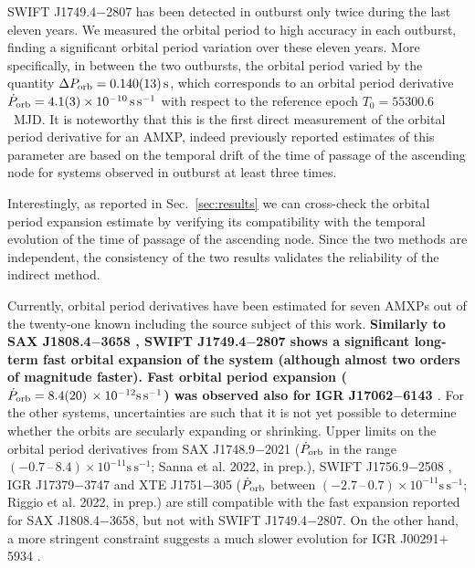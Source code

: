 \documentclass[fleqn,usenatbib]{mnras}
\newcommand{\swiftj}{SWIFT J1749.4$-$2807}
\begin{document}
\swiftj{} has been detected in outburst only twice during the last eleven years. We measured the orbital period to high accuracy in each outburst, finding a significant orbital period variation over these eleven years. More specifically, in between the two outbursts, the orbital period varied by the quantity $\Delta P_{\rm orb}=0.140(13)\,\text{s}$, which corresponds to an orbital period derivative $\dot{P}_{\rm orb}=4.1(3)\times 10^{-10}\,\text{s}\,\text{s}^{-1}$ with respect to the reference epoch $T_0 = 55300.6$~MJD. It is noteworthy that this is the first direct measurement of the orbital period derivative for an AMXP, indeed previously reported estimates of this parameter are based on the temporal drift of the time of passage of the ascending node for systems observed in outburst at least three times.  

Interestingly, as reported in Sec.~\ref{sec:results} we can cross-check the orbital period expansion estimate by verifying its compatibility with the temporal evolution of the time of passage of the ascending node. Since the two methods are independent, the consistency of the two results validates the reliability of the indirect method.  

Currently, orbital period derivatives have been estimated for seven AMXPs out of the twenty-one known including the source subject of this work. \textbf{Similarly to SAX J1808.4$-$3658 \citep[$\dot{P}_{\rm orb}=1.7(5)\,\times 10^{-12}\text{s}\,\text{s}^{-1}$, see e.g.,][]{di-Salvo:2008uu, Patruno:2017ah,Sanna:2017vj,Bult:2020tu}, \swiftj{} shows a significant long-term fast orbital expansion of the system (although almost two orders of magnitude faster). Fast orbital period expansion ($\dot{P}_{\rm orb}=8.4(20)\,\times 10^{-12}\text{s}\,\text{s}^{-1}$) was observed also for IGR J17062$-$6143 \citep{Bult:2021vs}}. For the other systems, uncertainties are such that it is not yet possible to determine whether the orbits are secularly expanding or shrinking. Upper limits on the orbital period derivatives from SAX J1748.9$-$2021 ($\dot{P}_{\rm orb}$ in the range $(-0.7\,\mbox{--}\,8.4)\times 10^{-11}\text{s}\,\text{s}^{-1}$; Sanna et al. 2022, in prep.), SWIFT J1756.9$-$2508 \citep[$\dot{P}_{\rm orb}$ ranging between $(-4.1\,\mbox{--}\,7.1)\times 10^{-12}\text{s}\,\text{s}^{-1}$, see e.g.,][]{Bult:2018ve,Sanna:2018aa}, IGR J17379$-$3747 \citep[$\dot{P}_{\rm orb}$ between $(-9.4\,\mbox{--}\,4.4)\times 10^{-12}\text{s}\,\text{s}^{-1}$;][]{Sanna:2018tx} and XTE J1751$-$305 ($\dot{P}_{\rm orb}$ between $(-2.7\,\mbox{--}\,0.7)\times 10^{-11}\text{s}\,\text{s}^{-1}$; Riggio et al. 2022, in prep.) are still compatible with the fast expansion reported for SAX J1808.4$-$3658, but not with \swiftj{}. On the other hand, a more stringent constraint suggests a much slower evolution for IGR J00291$+$5934 \citep[$\dot{P}_{\rm orb}$ between $(-6.6\,\mbox{--}\,6.5)\times 10^{-13}\text{s}\,\text{s}^{-1}$, see e.g.,][]{Patruno:2017vp, Sanna:2017tx}.
\end{document}
